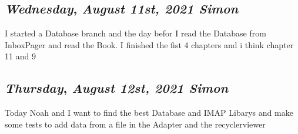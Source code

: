 \begin{center}
\section*{\month}
\end{center}


\def\day{\textit{August 11st, 2021 Simon}}
\def\weekday{\textit{Wednesday}}
\subsection*{\weekday, \day}

I started a Database branch and the day befor I read the Database from InboxPager and read the Book. 
I finished the fist 4 chapters and i think chapter 11 and 9



\def\day{\textit{August 12st, 2021 Simon}}
\def\weekday{\textit{Thursday}}
\subsection*{\weekday, \day}

Today Noah and I want to find the best Database and IMAP Libarys 
and make some tests to add data from a file in the Adapter and the recyclerviewer
